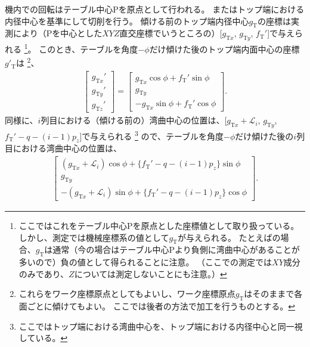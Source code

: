 \clearpage
機内での回転はテーブル中心Pを原点として行われる。
また\DimpleMilling はトップ端における内径中心を基準にして切削を行う。
傾ける前のトップ端内径中心$g_\mathrm T$の座標は実測により（Pを中心とした$XYZ$直交座標でいうところの）[$g_{\mathrm Tx}$, $g_{\mathrm Ty}$, $f_\mathrm T'$]で与えられる
\footnote{ここではこれをテーブル中心Pを原点とした座標値として取り扱っている。
しかし、測定では機械座標系の値として$g_\mathrm T$が与えられる。
たとえば\Dimple の場合、$g_\mathrm T$は通常（今の場合はテーブル中心Pより負側に湾曲中心があることが多いので）負の値として得られることに注意。
（ここでの測定では$XY$成分のみであり、$Z$については測定しないことにも注意。）}。
このとき、テーブルを角度$-\phi$だけ傾けた後のトップ端内面中心の座標$g'_\mathrm T$は
\footnote{これらをワーク座標原点としてもよいし、ワーク座標原点$g_\mathrm T$はそのままで各面ごとに傾けてもよい。
ここでは後者の方法で加工を行うものとする。}、
\begin{align}
  \label{eq:afterPhiTCenterFromO}
  \left[
  \begin{array}{c}
    g_{\mathrm Tx}'\\
    g_{\mathrm Ty}'\\
    g_{\mathrm Tz}'
  \end{array}
  \right]
  =\left[
   \begin{array}{c}
     g_{\mathrm Tx}\cos\phi+f_\mathrm T'\sin\phi\\
     g_{\mathrm Ty}\\
     -g_{\mathrm Tx}\sin\phi+f_\mathrm T'\cos\phi
   \end{array}
   \right].
   \end{align}
同様に、$i$列目における（傾ける前の）湾曲中心の位置は、[$g_{\mathrm Tx}+\mathcal L_i$, $g_{\mathrm Ty}$, $f_\mathrm T'-q-(i-1)p_z$]で与えられる
\footnote{ここではトップ端における湾曲中心を、トップ端における内径中心と同一視している。}
ので、テーブルを角度$-\phi$だけ傾けた後の$i$列目における湾曲中心の位置は、
\begin{align*}
  \left[
  \begin{array}{c}
    (g_{\mathrm Tx}+\mathcal L_i)\cos\phi+\{f_\mathrm T'-q-(i-1)p_z\}\sin\phi\\
    g_{\mathrm Ty}\\
    -(g_{\mathrm Tx}+\mathcal L_i)\sin\phi+\{f_\mathrm T'-q-(i-1)p_z\}\cos\phi
  \end{array}
  \right].
\end{align*}

